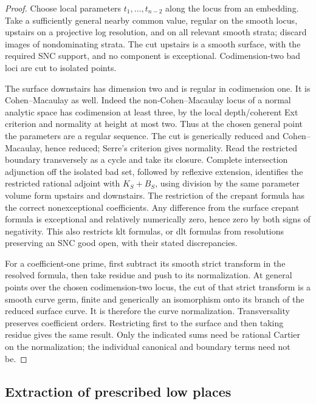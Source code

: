 \documentclass[11pt,letterpaper]{article}
\theoremstyle{definition}
\theoremstyle{remark}
\begin{document}
\begin{proof}
Choose local parameters $t_1,\ldots,t_{n-2}$ along the locus from an
embedding.  Take a sufficiently general nearby common value, regular
on the smooth locus, upstairs on a projective log resolution, and on
all relevant smooth strata; discard images of nondominating strata.
The cut upstairs is a smooth surface, with the required SNC support,
and no component is exceptional.  Codimension-two bad loci are cut
to isolated points.

The surface downstairs has dimension two and is regular in
codimension one.  It is Cohen--Macaulay as well.  Indeed the
non-Cohen--Macaulay locus of
a normal analytic space has codimension at least three, by the local
depth/coherent Ext criterion and normality at height at most two.
Thus at the chosen general point the parameters are a regular
sequence.  The cut is generically reduced and Cohen--Macaulay, hence
reduced; Serre's criterion gives normality.  Read the restricted
boundary transversely as a cycle and take its closure.  Complete
intersection adjunction off the isolated bad set, followed by
reflexive extension, identifies the restricted rational adjoint with
$K_S+B_S$, using division by the same parameter volume form upstairs
and downstairs.  The restriction of the crepant formula has the
correct nonexceptional coefficients.  Any difference from the
surface crepant formula is exceptional and relatively numerically
zero, hence zero by both signs of negativity.  This also restricts
klt formulas, or dlt formulas from resolutions preserving an SNC
good open, with their stated discrepancies.

For a coefficient-one prime, first subtract its smooth strict
transform in the resolved formula, then take residue and push to
its normalization.  At general points over the chosen
codimension-two locus, the cut of that strict transform is a smooth
curve germ, finite and generically an isomorphism onto its branch of
the reduced surface curve.  It is therefore the curve normalization.
Transversality preserves coefficient orders.  Restricting first to
the surface and then taking residue gives the same result.  Only
the indicated sums need be rational Cartier on the normalization;
the individual canonical and boundary terms need not be.
\end{proof}

\subsection{Extraction of prescribed low places}
\label{bir:extraction-section}
\end{document}
